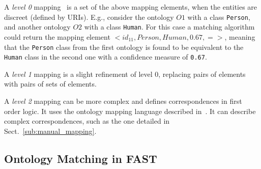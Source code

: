 \begin{inparaenum}[(a)]
    \item A \textit{level 0} mapping~\cite{euzenat2004api} is a set of the above mapping elements, when the entities are discreet (defined by URIs). E.g., consider the ontology $O1$ with a class \texttt{Person}, and another ontology $O2$ with a class \texttt{Human}. For this case a matching algorithm  could return the mapping element $< id_{11}, Person, Human, 0.67, = >$, meaning that the \texttt{Person} class from the first ontology is found to be equivalent to the \texttt{Human} class in the second one with a confidence measure of \texttt{0.67}.
    \item A \textit{level 1} mapping is a slight refinement of level 0, replacing pairs of elements with pairs of sets of elements.
    \item A \textit{level 2} mapping can be more complex and defines correspondences in first order logic. It uses the ontology mapping language described in~\cite{scharffe2005language}. It can describe complex correspondences, such as the one detailed in Sect.~\ref{sub:manual_mapping}.
\end{inparaenum}
% 
 

\subsection{Ontology Matching in FAST}
\label{ominfast}

